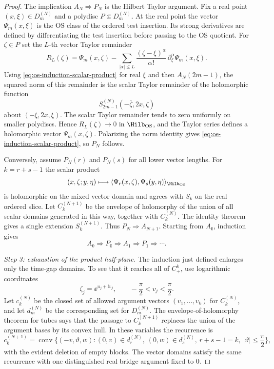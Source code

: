 \begin{proof}
The implication \(A_N\Rightarrow P_N\) is the Hilbert Taylor argument.  Fix a
real point \((x,\xi)\in D_m^{(N)}\) and a polydisc \(P\Subset D_m^{(N)}\).
At the real point the vector \(\Psi_m(x,\xi)\) is the OS class of the ordered
test insertion.  Its strong derivatives are defined by differentiating the
test insertion before passing to the OS quotient.  For
\(\zeta\in P\) set the \(L\)-th vector Taylor remainder
\[
  R_L(\zeta)
  =
  \Psi_m(x,\zeta)
  -
  \sum_{|\alpha|\le L}
    \frac{(\zeta-\xi)^\alpha}{\alpha!}\,
    \partial^\alpha_\xi\Psi_m(x,\xi).
\]
Using \eqref{eq:os-induction-scalar-product} for real \(\xi\) and then
\(A_N(2m-1)\), the squared norm of this remainder is the scalar Taylor
remainder of the holomorphic function
\[
  S_{2m-1}^{(N)}(-\overline\zeta,2x,\zeta)
\]
about \((-\xi,2x,\xi)\).  The scalar Taylor remainder tends to zero uniformly
on smaller polydiscs.  Hence \(R_L(\zeta)\to0\) in
\(\Hilb_{\rm OS}\), and the Taylor series defines a holomorphic vector
\(\Psi_m(x,\zeta)\).  Polarizing the norm identity gives
\eqref{eq:os-induction-scalar-product}, so \(P_N\) follows.

Conversely, assume \(P_N(r)\) and \(P_N(s)\) for all lower vector lengths.
For \(k=r+s-1\) the scalar product
\[
  (x,\zeta;y,\eta)\longmapsto
  \langle\Psi_r(x,\zeta),\Psi_s(y,\eta)\rangle_{\Hilb_{\rm OS}}
\]
is holomorphic on the mixed vector domain and agrees with \(S_k\) on the real
ordered slice.  Let \(C_k^{(N+1)}\) be the envelope of holomorphy of the union
of all scalar domains generated in this way, together with \(C_k^{(N)}\).
The identity theorem gives a single extension \(S_k^{(N+1)}\).  Thus
\(P_N\Rightarrow A_{N+1}\).  Starting from \(A_0\), induction gives
\[
  A_0\Rightarrow P_0\Rightarrow A_1\Rightarrow P_1\Rightarrow\cdots .
\]

\emph{Step 3: exhaustion of the product half-plane.}
The induction just defined enlarges only the time-gap domains.  To see that it
reaches all of \(C_+^k\), use logarithmic coordinates
\[
  \zeta_j=\ee^{u_j+\ii v_j},\qquad -\frac{\pi}{2}<v_j<\frac{\pi}{2}.
\]
Let \(c_k^{(N)}\) be the closed set of allowed argument vectors
\((v_1,\ldots,v_k)\) for \(C_k^{(N)}\), and let \(d_m^{(N)}\) be the
corresponding set for \(D_m^{(N)}\).  The envelope-of-holomorphy theorem for
tubes says that the passage to \(C_k^{(N+1)}\) replaces the union of the
argument bases by its convex hull.  In these variables the recurrence is
\begin{equation}
  c_k^{(N+1)}
  =
  \operatorname{conv}
  \{(-v,\vartheta,w):
    (0,v)\in d_r^{(N)},\ (0,w)\in d_s^{(N)},\
    r+s-1=k,\ |\vartheta|\le\frac{\pi}{2}\},
  \label{eq:os-ii-argument-convex-recurrence}
\end{equation}
with the evident deletion of empty blocks.  The vector domains satisfy the
same recurrence with one distinguished real bridge argument fixed to \(0\).


\end{proof}
